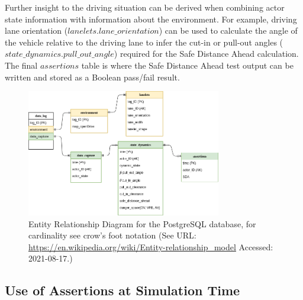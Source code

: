 Further insight to the driving situation can be derived when combining actor state information with information about the environment. For example, driving lane orientation ($lanelets.lane\_orientation$) can be used to calculate the angle of the vehicle relative to the driving lane to infer the cut-in or pull-out angles ($state\_dynamics.pull\_out\_angle$) required for the Safe Distance Ahead calculation. The final $assertions$ table is where the Safe Distance Ahead test output can be written and stored as a Boolean pass/fail result.

\begin{figure}[htp]
    \centering
    \includegraphics[width=8.5cm]{../other/figures/ERD2.png}
    \caption{Entity Relationship Diagram for the PostgreSQL database, for cardinality see crow's foot notation (See URL: \url{https://en.wikipedia.org/wiki/Entity-relationship\_model} Accessed: 2021-08-17.)}
    \label{fig:erd}
\end{figure}


\subsection{Use of Assertions at Simulation Time} \label{Assertions_at_Sim_Time}

